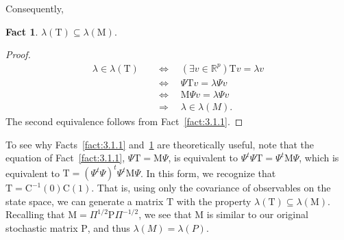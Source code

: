 \documentclass[12pt,letterpaper]{report}
\theoremstyle{plain}
\theoremstyle{definition}
\newtheorem{fact}{Fact}[chapter]
\theoremstyle{remark}
\numberwithin{theorem}{chapter}
\numberwithin{claim}{chapter}
\numberwithin{equation}{chapter}
\numberwithin{conjecture}{chapter}
\newcommand\R{\ensuremath{\mathbb{R}}}
\newcommand\C{\ensuremath{\mathrm{C}}}
\renewcommand\P{\ensuremath{\mathrm{P}}}
\newcommand\M{\ensuremath{\mathrm{M}}}
\newcommand\T{\ensuremath{\mathrm{T}}}
\newcommand\<{\ensuremath{\langle}}
\renewcommand\>{\ensuremath{\rangle}}
\begin{document}
Consequently,
\begin{fact}
\label{fact:3.1.2}
$\lambda(\T) \subseteq \lambda(\M)$.
\end{fact}
\begin{proof}
~
\vskip-2cm
  \begin{align*}
\lambda \in \lambda(\T)
& \quad \Longleftrightarrow  \quad
(\exists v \in \R^p) \T v = \lambda v\\
& \quad \Longleftrightarrow  \quad
\Psi \T v = \lambda \Psi v\\
& \quad \Longleftrightarrow  \quad
\M \Psi v = \lambda \Psi v\\
& \quad \Longrightarrow  \quad
\lambda \in \lambda(M).
  \end{align*}
The second equivalence follows from Fact~\ref{fact:3.1.1}.  %
\end{proof}
To see why Facts~\ref{fact:3.1.1} and~\ref{fact:3.1.2} are theoretically useful,
note that the equation of Fact~\ref{fact:3.1.1}, $\Psi \T = \M \Psi$, is
equivalent to 
$\Psi^t\Psi \T = \Psi^t \M \Psi$, which is equivalent to 
$\T = (\Psi^t\Psi)^t \Psi^t \M\Psi$.
In this form, we recognize that $\T = \C^{-1}(0)\C(1)$. That is, using only the
covariance of observables on the state space, we can generate a matrix $\T$ with
the property $\lambda(\T) \subseteq \lambda(\M)$. Recalling that 
$\M = \Pi^{1/2}\P\Pi^{-1/2}$, 
we see that $\M$ is similar to our original stochastic matrix $\P$, 
and thus $\lambda(M) = \lambda(P)$.
\end{document}
